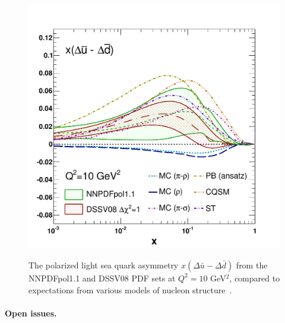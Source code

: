 \begin{figure}[!h]
\centering
\includegraphics[scale=0.35]{plots/asysea_2}\\
\caption{\small The polarized light sea quark asymmetry 
$x(\Delta\bar{u}-\Delta\bar{d})$ from the NNPDFpol1.1 and 
DSSV08 PDF sets at $Q^2=10$ GeV$^2$, compared to expectations from 
various models of nucleon structure~\cite{Chang:2014jba}.}
\label{fig:RHICpdfs1}
\end{figure}

\paragraph{Open issues.}

